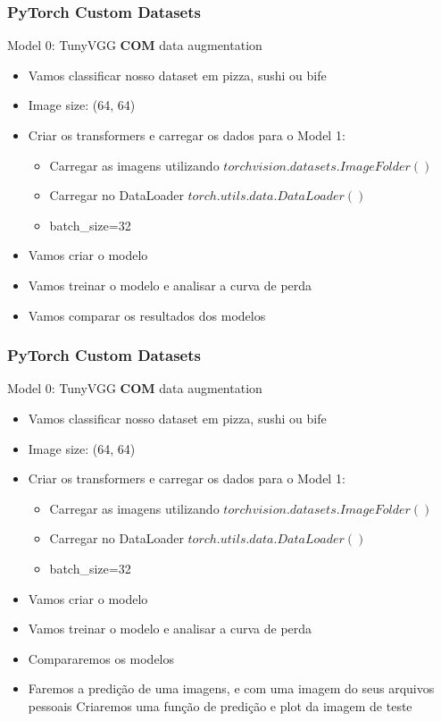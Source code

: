 \documentclass{beamer}
\begin{document}
\begin{frame}
	\frametitle{PyTorch Custom Datasets}
	\begin{block}{Model 0: TunyVGG \textbf{COM} data augmentation}
		\begin{itemize}
			\item Vamos classificar nosso dataset em pizza, sushi ou bife
			\item Image size: (64, 64)
			\item Criar os transformers e carregar os dados para o Model 1:
			\begin{itemize}
				\item Carregar as imagens utilizando $torchvision.datasets.ImageFolder()$
				\item Carregar no DataLoader $torch.utils.data.DataLoader()$ 
				\item batch\_size=32
			\end{itemize}
			\item Vamos criar o modelo
			\item Vamos treinar o modelo e analisar a curva de perda
			\item Vamos comparar os resultados dos modelos
		\end{itemize}
	\end{block}
\end{frame}           

\begin{frame}
	\frametitle{PyTorch Custom Datasets}
	\begin{block}{Model 0: TunyVGG \textbf{COM} data augmentation}
		\begin{itemize}
			\item Vamos classificar nosso dataset em pizza, sushi ou bife
			\item Image size: (64, 64)
			\item Criar os transformers e carregar os dados para o Model 1:
			\begin{itemize}
				\item Carregar as imagens utilizando $torchvision.datasets.ImageFolder()$
				\item Carregar no DataLoader $torch.utils.data.DataLoader()$ 
				\item batch\_size=32
			\end{itemize}
			\item Vamos criar o modelo
			\item Vamos treinar o modelo e analisar a curva de perda
			\item Compararemos os modelos
			\item Faremos a predição de uma imagens, e com uma imagem do seus arquivos pessoais
			Criaremos uma função de predição e plot da imagem de teste
		\end{itemize}
	\end{block}
\end{frame}           
\end{document}
